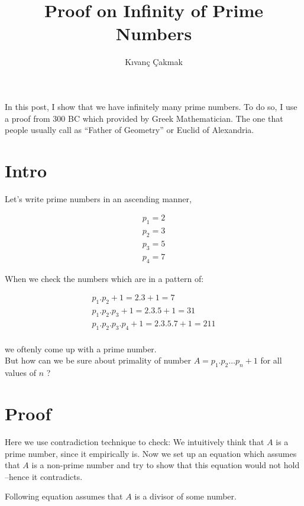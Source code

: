 \documentclass[11pt]{article}
\title{\textbf{Proof on Infinity of Prime Numbers}}
\author{K{\i}van\c{c} \c{C}akmak\\}
\date{}
\begin{document}
\maketitle

In this post, I show that we have infinitely many prime numbers. To do so, I use a proof from 300 BC which provided by Greek Mathematician. The one that people usually call as “Father of Geometry” or Euclid of Alexandria. 

\section{Intro}

Let's write prime numbers in an ascending manner,

\begin{equation}
\begin{split}
p_1 = 2 \\
p_2 = 3 \\
p_3 = 5  \\
 p_4 = 7
\end{split}
\end{equation}

When we check the numbers which are in a pattern of: 

\begin{equation}
\begin{split}
p_1.p_2 + 1 = 2.3 + 1 = 7 \\
 p_1.p_2.p_3 + 1 = 2.3.5 + 1 = 31 \\
p_1.p_2.p_3.p_4 + 1 = 2.3.5.7 + 1 = 211 \\
\end{split}
\end{equation}

we oftenly come up with a prime number.\\

But how can we be sure about primality of number $A = p_1.p_2 \dots p_n + 1$ for all values of $n$ ? 

\section{Proof}
Here we use contradiction technique to check: We intuitively think that $A$ is a prime number, since it empirically is. Now we set up an equation which assumes that $A$ is a non-prime number and try to show that this equation would not hold --hence it contradicts.

Following equation assumes that $A$ is a divisor of some number. \\
\end{document}
